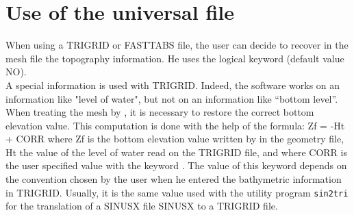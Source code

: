 \section{Use of the universal file}
When using a TRIGRID or FASTTABS file, the user can decide to recover in the
mesh file the topography information. He uses the logical keyword
 (default value NO).\\
A special information is used with TRIGRID. Indeed, the software works on an
information like "level of water", but not on an information like “bottom
level”. When treating the mesh by \stbtel, it is necessary to restore the
correct bottom elevation value. This computation is done with the help of the
formula: Zf = -Ht + CORR where Zf is the bottom elevation value written by
\stbtel in the geometry file, Ht  the value of the level of water read on the
TRIGRID file, and where CORR  is the user specified value with the keyword
. The value of this keyword depends on the
convention chosen by the user when he entered the bathymetric information in
TRIGRID. Usually, it is the same value used with the utility program \verb!sin2tri!
for the translation of a SINUSX file SINUSX to a TRIGRID file.
